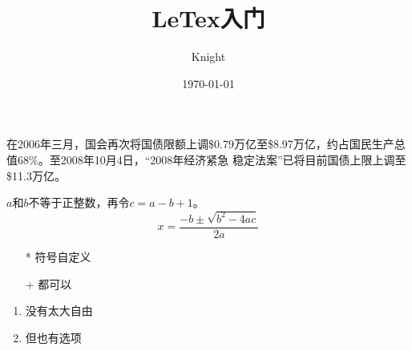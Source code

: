 \documentclass[UTF8]{ctexart}
\title{LeTex入门}
\author{Knight}
\date{\today}
\begin{document}
\maketitle
在2006年三月，国会再次将国债限额上调\$0.79万亿至\$8.97万亿，约占国民生产总值68\%。至2008年10月4日，``2008年经济紧急
稳定法案''已将目前国债上限上调至\$11.3万亿。

$a$和$b$不等于正整数，再令$c=a-b+1$。
\begin{equation}
    x=\frac{ -b\pm \sqrt{b^2-4ac}}
    {2a}
\end{equation}

\begin{itemize}
    \item [*]符号自定义
    \item [+]都可以
\end{itemize}
\begin{enumerate}
    \item 没有太大自由
    \item 但也有选项
\end{enumerate}
\end{document}
